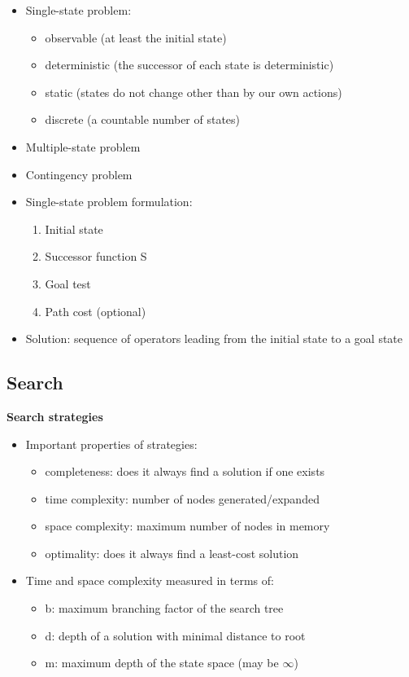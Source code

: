 \documentclass{scrartcl}
\begin{document}
\begin{itemize}
    \item
        Single-state problem:
        \begin{itemize}
            \item
                observable (at least the initial state)
            \item
                deterministic (the successor of each state is deterministic)
            \item
                static (states do not change other than by our own actions)
            \item
                discrete (a countable number of states)
        \end{itemize}
    \item
        Multiple-state problem
    \item
        Contingency problem\\
    \item
        Single-state problem formulation:
        \begin{enumerate}
            \item
                Initial state
            \item
                Successor function S
            \item
                Goal test
            \item
                Path cost (optional)
        \end{enumerate}
    \item
        Solution: sequence of operators leading from the initial state to a goal state
\end{itemize}
\subsection{Search}
\textbf{Search strategies}
\begin{itemize}
    \item
        Important properties of strategies:
        \begin{itemize}
            \item
                completeness: does it always find a solution if one exists
            \item
                time complexity: number of nodes generated/expanded
            \item
                space complexity: maximum number of nodes in memory
            \item
                optimality: does it always find a least-cost solution
        \end{itemize}
    \item
        Time and space complexity measured in terms of:
        \begin{itemize}
            \item
                b: maximum branching factor of the search tree
            \item
                d: depth of a solution with minimal distance to root
            \item
                m: maximum depth of the state space (may be $\infty$)
        \end{itemize}
\end{itemize}
\end{document}
